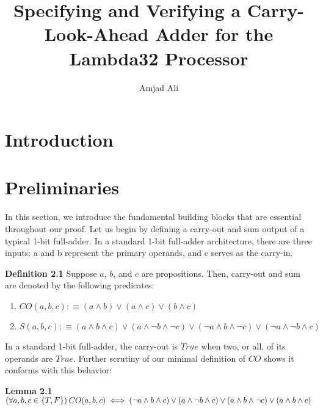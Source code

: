 \documentclass{article}
\title{Specifying and Verifying a Carry-Look-Ahead Adder for the Lambda32 Processor}
\author{Amjad Ali}
\begin{document}
\maketitle

\begin{abstract}
\lipsum[1]
\end{abstract}

\section{Introduction}
\lipsum[1-2] 

\section{Preliminaries}
In this section, we introduce the fundamental building blocks that are essential throughout our proof. Let us begin by defining a carry-out and sum output of a typical 1-bit full-adder. In a standard 1-bit full-adder architecture, there are three inputs: a and b represent the primary operands, and c serves as the carry-in.

\noindent \textbf{Definition 2.1} Suppose $a$, $b$, and $c$ are propositions. Then, carry-out and sum are denoted by the following predicates:

\begin{enumerate}
	\item $CO(a, b, c) :\equiv (a \land b) \lor (a \land c) \lor (b \land c)$
	
	\item $S(a, b, c) :\equiv 
	(a \land b \land c) \lor 
	(a \land \lnot b \land \lnot c) \lor 
	(\lnot a \land b \land \lnot c) \lor
	(\lnot a \land \lnot b \land c) $
\end{enumerate}

In a standard 1-bit full-adder, the carry-out is  $True$ when two, or all, of its operands are $True$. Further scrutiny of our minimal definition of $CO$ shows it conforms with this behavior:

\noindent \textbf{Lemma 2.1}  $ (\forall a, b, c \in \{T, F\}) \: CO(a, b, c) \iff  (\lnot a \land b \land c) \lor (a \land \lnot b \land c) \lor \\ (a \land b \land \lnot c) \lor  (a \land b \land c)$ 
\end{document}
